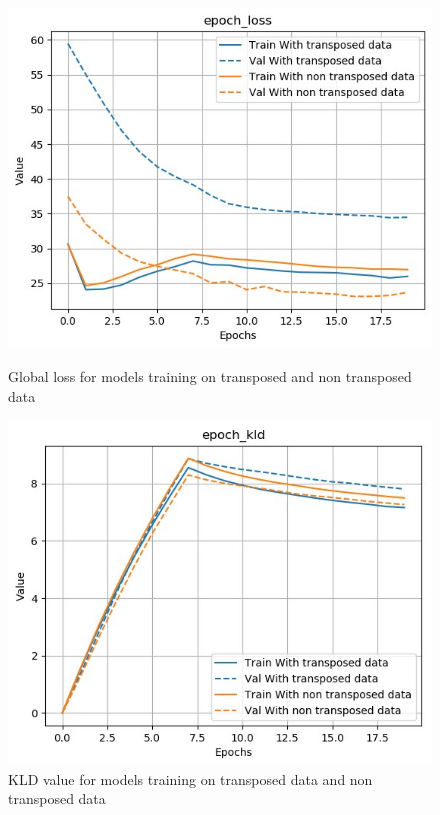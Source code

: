 \documentclass[12pt]{report}
\begin{document}
\begin{figure}[htbp]
    \begin{minipage}{0.5\textwidth}
        \begin{center}
            \includegraphics[width=\textwidth]{images/experiences/transpose-rnn/loss-comparison-transpose.jpg}
            \caption{Global loss for models training on transposed and non transposed data}
            \label{fig:loss-comparison-transpose}
        \end{center}
    \end{minipage} \hfill
    \begin{minipage}{0.5 \textwidth}
        \begin{center}
            \includegraphics[width=\textwidth]{images/experiences/transpose-rnn/kld-comparison-transpose.jpg}
            \caption{KLD value for models training on transposed data and non transposed data}
            \label{fig:kld-comparison-transpose}
        \end{center}
    \end{minipage}
\end{figure}
\end{document}
